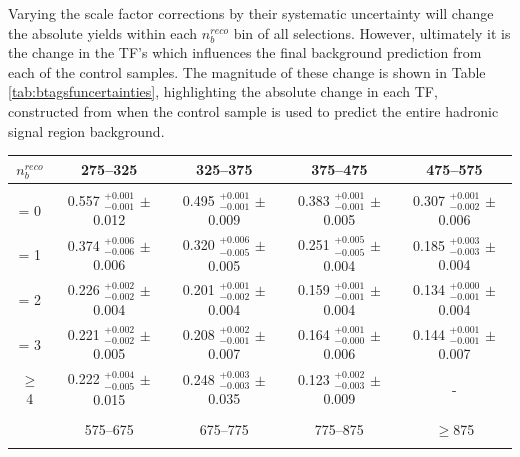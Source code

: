 Varying the scale factor corrections by their systematic uncertainty will change the absolute yields within  each $n_{b}^{reco}$ bin of all selections. However, ultimately it is the change in the \ac{TF}'s which influences the final background prediction from each of the control samples. The magnitude of these change is shown in Table \ref{tab:btagsfuncertainties}, highlighting the absolute change in each \ac{TF}, constructed from when the \mupjets control sample is used to predict the entire hadronic signal region background. 

\def\arraystretch{1.3}
\begin{table}[ht!]
\begin{center}
\footnotesize
\begin{tabular*}{0.95\textwidth}{@{\extracolsep{\fill}} ccccc}
\hline
$n_{b}^{reco}$         & 275--325                  & 325--375                  & 375--475                  & 475--575                 \\ 
\hline\hline
\\
= 0                    & 0.557 $^{+0.001}_{-0.001}$  $\pm$  0.012       & 0.495 $^{+0.001}_{-0.001}$  $\pm$  0.009       & 0.383 $^{+0.001}_{-0.001}$  $\pm$  0.005       & 0.307 $^{+0.001}_{-0.002}$  $\pm$  0.006      \\
= 1                    & 0.374 $^{+0.006}_{-0.006}$  $\pm$  0.006       & 0.320 $^{+0.006}_{-0.005}$ $\pm$  0.005        & 0.251 $^{+0.005}_{-0.005}$ $\pm$  0.004        & 0.185 $^{+0.003}_{-0.003}$  $\pm$  0.004      \\
= 2                    & 0.226 $^{+0.002}_{-0.002}$  $\pm$  0.004       & 0.201 $^{+0.001}_{-0.002}$ $\pm$  0.004        & 0.159 $^{+0.001}_{-0.001}$ $\pm$  0.004       & 0.134 $^{+0.000}_{-0.001}$   $\pm$  0.004      \\
= 3                    & 0.221 $^{+0.002}_{-0.002}$  $\pm$  0.005       & 0.208 $^{+0.002}_{-0.001}$ $\pm$  0.007       & 0.164 $^{+0.001}_{-0.000}$  $\pm$  0.006       & 0.144 $^{+0.001}_{-0.001}$   $\pm$  0.007      \\
$\geq$ 4               & 0.222 $^{+0.004}_{-0.005}$  $\pm$  0.015       & 0.248 $^{+0.003}_{-0.003}$ $\pm$  0.035       & 0.123 $^{+0.002}_{-0.003}$  $\pm$  0.009       & -     \\ 
\\
\hline
                       & 575--675                  & 675--775                  & 775--875                  & $\geq$875           \\ 
\hline\hline
\\

\end{tabular*}
\end{center}
\end{table}
